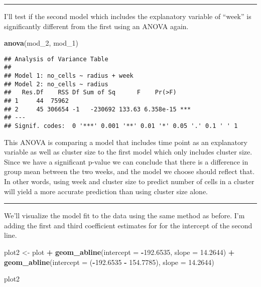 \documentclass[]{article}
\newenvironment{Shaded}{\begin{snugshade}}{\end{snugshade}}
\newcommand{\KeywordTok}[1]{\textcolor[rgb]{0.13,0.29,0.53}{\textbf{#1}}}
\newcommand{\DataTypeTok}[1]{\textcolor[rgb]{0.13,0.29,0.53}{#1}}
\newcommand{\DecValTok}[1]{\textcolor[rgb]{0.00,0.00,0.81}{#1}}
\newcommand{\FloatTok}[1]{\textcolor[rgb]{0.00,0.00,0.81}{#1}}
\newcommand{\StringTok}[1]{\textcolor[rgb]{0.31,0.60,0.02}{#1}}
\newcommand{\OperatorTok}[1]{\textcolor[rgb]{0.81,0.36,0.00}{\textbf{#1}}}
\newcommand{\NormalTok}[1]{#1}
\begin{document}
\begin{center}\rule{0.5\linewidth}{\linethickness}\end{center}

I'll test if the second model which includes the explanatory variable of
``week'' is significantly different from the first using an ANOVA again.

\begin{Shaded}
\begin{Highlighting}[]
\KeywordTok{anova}\NormalTok{(mod_}\DecValTok{2}\NormalTok{, mod_}\DecValTok{1}\NormalTok{)}
\end{Highlighting}
\end{Shaded}

\begin{verbatim}
## Analysis of Variance Table
## 
## Model 1: no_cells ~ radius + week
## Model 2: no_cells ~ radius
##   Res.Df    RSS Df Sum of Sq      F    Pr(>F)    
## 1     44  75962                                  
## 2     45 306654 -1   -230692 133.63 6.358e-15 ***
## ---
## Signif. codes:  0 '***' 0.001 '**' 0.01 '*' 0.05 '.' 0.1 ' ' 1
\end{verbatim}

This ANOVA is comparing a model that includes time point as an
explanatory variable as well as cluster size to the first model which
only includes cluster size. Since we have a significant p-value we can
conclude that there is a difference in group mean between the two weeks,
and the model we choose should reflect that. In other words, using week
and cluster size to predict number of cells in a cluster will yield a
more accurate prediction than using cluster size alone.

\begin{center}\rule{0.5\linewidth}{\linethickness}\end{center}

We'll visualize the model fit to the data using the same method as
before. I'm adding the first and third coefficient estimates for for the
intercept of the second line.

\begin{Shaded}
\begin{Highlighting}[]
\NormalTok{plot2 <-}\StringTok{ }\NormalTok{plot }\OperatorTok{+}
\StringTok{  }\KeywordTok{geom_abline}\NormalTok{(}\DataTypeTok{intercept =} \OperatorTok{-}\FloatTok{192.6535}\NormalTok{, }\DataTypeTok{slope =} \FloatTok{14.2644}\NormalTok{) }\OperatorTok{+}
\StringTok{  }\KeywordTok{geom_abline}\NormalTok{(}\DataTypeTok{intercept =}\NormalTok{ (}\OperatorTok{-}\FloatTok{192.6535} \OperatorTok{-}\StringTok{ }\FloatTok{154.7785}\NormalTok{), }\DataTypeTok{slope =} \FloatTok{14.2644}\NormalTok{)}

\NormalTok{plot2}
\end{Highlighting}
\end{Shaded}
\end{document}

